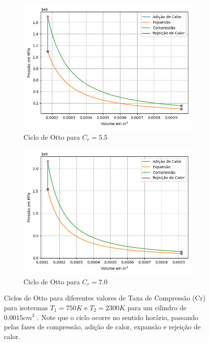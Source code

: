 \documentclass[10pt, conference, letterpaper]{IEEEtran}
\begin{document}
\begin{figure}[!ht]
    \begin{subfigure}{0.45\textwidth}
        \includegraphics[width=\linewidth]{Imagens/grafico_cr55.png}
        \caption{Ciclo de Otto para \(C_r  = 5.5\) }
        \label{fig:cr55}
    \end{subfigure}
    \hfill
    \begin{subfigure}{0.45\textwidth}
        \includegraphics[width=\linewidth]{Imagens/grafico_cr70.png}
        \caption{Ciclo de Otto para \(C_r  = 7.0\) }
        \label{fig:cr70}
    \end{subfigure}
    
    \caption{Ciclos de Otto para diferentes valores de Taxa de Compressão (Cr) para isotermas $T_1 = 750K$ e $T_2 = 2300K$ para um cilindro de  $0.0015 cm^3$ . Note que o ciclo ocorre no sentido horário, passando pelas fases de compressão, adição de calor, expansão e rejeição de calor.}
    \label{fig:ciclos_otto}
\end{figure}
\end{document}
